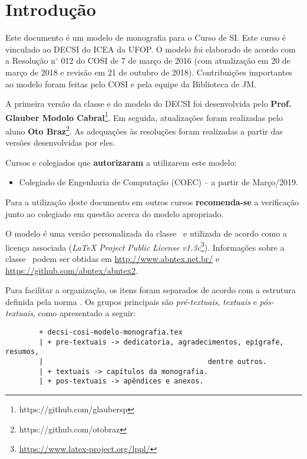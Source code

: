 \chapter{Introdução}
\label{cap:introducao}

Este documento é um modelo de monografia para o Curso de \acf{SI}. Este curso é vinculado ao \acf{DECSI} do \acf{ICEA} da \acf{UFOP}. O modelo foi elaborado de acordo com a Resolução n$^\circ$ 012 do \acf{COSI} de 7 de março de 2016 (com atualização em 20 de março de 2018 e revisão em 21 de outubro de 2018). Contribuições importantes ao modelo foram feitas pelo COSI e pela equipe da Biblioteca de \acf{JM}.

A primeira versão da classe e do modelo do DECSI foi desenvolvida pelo \textbf{Prof. Glauber Modolo Cabral}\footnote{https://github.com/glaubersp}. Em seguida, atualizações foram realizadas pelo aluno \textbf{Oto Braz}\footnote{https://github.com/otobraz}. As adequações às resoluções foram realizadas a partir das versões desenvolvidas por eles.

Cursos e colegiados que \textbf{autorizaram} a utilizarem este modelo:

	\begin{itemize}
		\item Colegiado de Engenharia de Computação (COEC) -- a partir de Março/2019.
	\end{itemize}

Para a utilização deste documento em outros cursos \textbf{recomenda-se} a verificação junto ao colegiado em questão acerca do modelo apropriado.

O modelo é uma versão personalizada da classe \abnTeX\ e utilizada de acordo como a licença associada (\textit{LaTeX Project Public License v1.3c}\footnote{\url{https://www.latex-project.org/lppl/}}). Informações sobre a classe \abnTeX\ podem ser obtidas em \url{http://www.abntex.net.br/} e \url{https://github.com/abntex/abntex2}.

Para facilitar a organização, os itens foram separados de acordo com a estrutura definida pela norma . Os grupos principais são \textit{pré-textuais}, \textit{textuais} e \textit{pós-textuais}, como apresentado a seguir:

\begin{verbatim}
		+ decsi-cosi-modelo-monografia.tex
		| + pre-textuais -> dedicatoria, agradecimentos, epígrafe, resumos,
		|										dentre outros.
		| + textuais -> capítulos da monografia.
		| + pos-textuais -> apêndices e anexos.
\end{verbatim}

